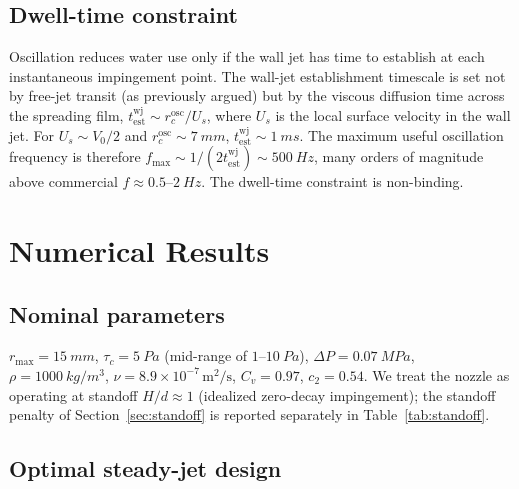 \documentclass[aps,prfluids,reprint,amsmath,amssymb,floatfix]{revtex4-2}
\begin{document}
\subsection{Dwell-time constraint}

Oscillation reduces water use only if the wall jet has time to establish
at each instantaneous impingement point. The wall-jet establishment
timescale is set not by free-jet transit (as previously argued) but by
the viscous diffusion time across the spreading film,
$t_\mathrm{est}^\mathrm{wj} \sim r_c^\mathrm{osc}/U_s$, where
$U_s$ is the local surface velocity in the wall jet. For $U_s \sim V_0/2$
and $r_c^\mathrm{osc} \sim \SI{7}{mm}$, $t_\mathrm{est}^\mathrm{wj}
\sim \SI{1}{ms}$. The maximum useful oscillation frequency is therefore
$f_\mathrm{max} \sim 1/(2 t_\mathrm{est}^\mathrm{wj}) \sim \SI{500}{Hz}$,
many orders of magnitude above commercial $f \approx 0.5$--$\SI{2}{Hz}$.
The dwell-time constraint is non-binding.

\section{Numerical Results}
\label{sec:numerics}

\subsection{Nominal parameters}

$r_\mathrm{max} = \SI{15}{mm}$, $\tau_c = \SI{5}{Pa}$ (mid-range of
$1$--$\SI{10}{Pa}$), $\Delta P = \SI{0.07}{MPa}$, $\rho = \SI{1000}{kg/m^3}$,
$\nu = 8.9\times 10^{-7}\,\mathrm{m^2/s}$, $C_v = 0.97$, $c_2 = 0.54$.
We treat the nozzle as operating at standoff $H/d \approx 1$ (idealized
zero-decay impingement); the standoff penalty of Section~\ref{sec:standoff}
is reported separately in Table~\ref{tab:standoff}.

\subsection{Optimal steady-jet design}
\end{document}
